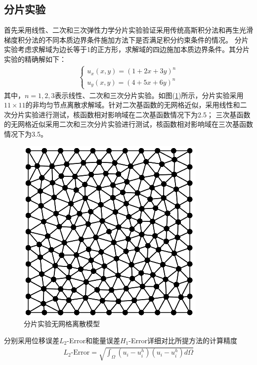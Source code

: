 \subsection{分片实验}
首先采用线性、二次和三次弹性力学分片实验验证采用传统高斯积分法和再生光滑梯度积分法的不同本质边界条件施加方法下是否满足积分约束条件的情况。
分片实验考虑求解域为边长等于1的正方形，求解域的四边施加本质边界条件。其分片实验的精确解如下：
\begin{equation}
\begin{split}
    \begin{cases}
        u_x(x,y)=(1+2x+3y)^n\\
        u_y(x,y)=(4+5x+6y)^n
    \end{cases}
\end{split}
\end{equation}
其中，$n=1,2,3$表示线性、二次和三次分片实验。如图(\ref{patchtestmeshfree})所示，分片实验采用$11\times 11$的非均匀节点离散求解域。针对二次基函数的无网格近似，采用线性和二次分片实验进行测试，核函数相对影响域在二次基函数情况下为2.5；
三次基函数的无网格近似采用二次和三次分片实验进行测试，核函数相对影响域在三次基函数情况下为3.5。\par
\begin{figure}[!h]
    \centering
    \includegraphics[scale=0.7]{figure/E/patchtestmeshfree.png}
    \caption{分片实验无网格离散模型}\label{patchtestmeshfree}
\end{figure}
分别采用位移误差$L_2$-Error和能量误差$H_1$-Error详细对比所提方法的计算精度
\begin{equation}
\begin{split}
    L_2\text{-Error}=\sqrt{\int_{\Omega}(u_i-u_i^h)(u_i-u_i^h)d\Omega}
\end{split}
\end{equation}
